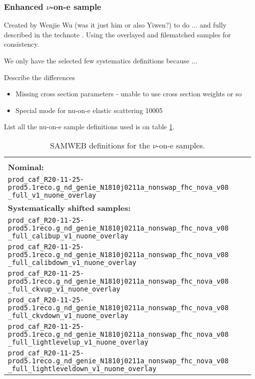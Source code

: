 \documentclass[12pt]{article}
\begin{document}
\subsubsection*{Enhanced $\nu$-on-e sample}
Created by Wenjie Wu (was it just him or also Yiwen?) to do ... and fully described in the technote \cite{NOVA-doc-56383}. Using the overlayed and filematched samples for consistency.

We only have the selected few systematics definitions because ... 

Describe the differences
\begin{itemize}
\item Missing cross section parameters - unable to use cross section weights or so
\item Special mode for nu-on-e elastic scattering 10005
\end{itemize}

List all the nu-on-e sample definitions used is on table \ref{tab:NuoneDefinitions}.

\begin{table}[!ht]
\centering
\begin{tabular}{p{\textwidth}}
\hline\hline\\
\textbf{Nominal:}\\
\texttt{prod\_caf\_R20-11-25-prod5.1reco.g\_nd\_genie\_N1810j0211a\_nonswap\_fhc\_nova\_v08} \texttt{\_full\_v1\_nuone\_overlay}\\[2mm]
\textbf{Systematically shifted samples:}\\
\texttt{prod\_caf\_R20-11-25-prod5.1reco.g\_nd\_genie\_N1810j0211a\_nonswap\_fhc\_nova\_v08} \texttt{\_full\_calibup\_v1\_nuone\_overlay}\\[2mm]
\texttt{prod\_caf\_R20-11-25-prod5.1reco.g\_nd\_genie\_N1810j0211a\_nonswap\_fhc\_nova\_v08} \texttt{\_full\_calibdown\_v1\_nuone\_overlay}\\[2mm]
\texttt{prod\_caf\_R20-11-25-prod5.1reco.g\_nd\_genie\_N1810j0211a\_nonswap\_fhc\_nova\_v08} \texttt{\_full\_ckvup\_v1\_nuone\_overlay}\\[2mm]
\texttt{prod\_caf\_R20-11-25-prod5.1reco.g\_nd\_genie\_N1810j0211a\_nonswap\_fhc\_nova\_v08} \texttt{\_full\_ckvdown\_v1\_nuone\_overlay}\\[2mm]
\texttt{prod\_caf\_R20-11-25-prod5.1reco.g\_nd\_genie\_N1810j0211a\_nonswap\_fhc\_nova\_v08} \texttt{\_full\_lightlevelup\_v1\_nuone\_overlay}\\[2mm]
\texttt{prod\_caf\_R20-11-25-prod5.1reco.g\_nd\_genie\_N1810j0211a\_nonswap\_fhc\_nova\_v08} \texttt{\_full\_lightleveldown\_v1\_nuone\_overlay}\\[2mm]
\hline\hline
\end{tabular}
\caption{SAMWEB definitions for the $\nu$-on-e samples.}
\label{tab:NuoneDefinitions}
\end{table}
\end{document}

